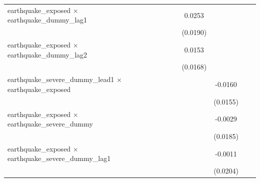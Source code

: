 \begin{tabular}{lcccccccc}
   earthquake\_exposed $\times$ earthquake\_dummy\_lag1               &                       &                       &                       &                       & 0.0253                &                       &                       &   \\   
                                                                      &                       &                       &                       &                       & (0.0190)              &                       &                       &   \\   
   earthquake\_exposed $\times$ earthquake\_dummy\_lag2               &                       &                       &                       &                       & 0.0153                &                       &                       &   \\   
                                                                      &                       &                       &                       &                       & (0.0168)              &                       &                       &   \\   
   earthquake\_severe\_dummy\_lead1 $\times$ earthquake\_exposed      &                       &                       &                       &                       &                       & -0.0160               &                       &   \\   
                                                                      &                       &                       &                       &                       &                       & (0.0155)              &                       &   \\   
   earthquake\_exposed $\times$ earthquake\_severe\_dummy             &                       &                       &                       &                       &                       & -0.0029               &                       &   \\   
                                                                      &                       &                       &                       &                       &                       & (0.0185)              &                       &   \\   
   earthquake\_exposed $\times$ earthquake\_severe\_dummy\_lag1       &                       &                       &                       &                       &                       & -0.0011               &                       &   \\   
                                                                      &                       &                       &                       &                       &                       & (0.0204)              &                       &   \\   

\end{tabular}
